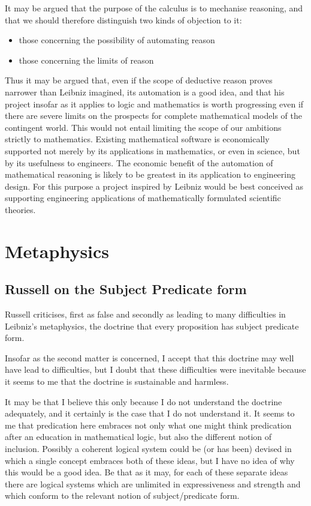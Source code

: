 \documentclass{rbjk}
\begin{document}
\begin{article}
It may be argued that the purpose of the calculus is to mechanise reasoning, and that we should therefore distinguish two kinds of objection to it:

\begin{itemize}
\item those concerning the possibility of automating reason
\item those concerning the limits of reason 
\end{itemize}

Thus it may be argued that, even if the scope of deductive reason proves narrower than Leibniz imagined, its automation is a good idea, and that his project insofar as it applies to logic and mathematics is worth progressing even if there are severe limits on the prospects for complete mathematical models of the contingent world.
This would not entail limiting the scope of our ambitions strictly to mathematics.
Existing mathematical software is economically supported not merely by its applications in mathematics, or even in science, but by its usefulness to engineers.
The economic benefit of the automation of mathematical reasoning is likely to be greatest in its application to engineering design.
For this purpose a project inspired by Leibniz would be best conceived as supporting engineering applications of mathematically formulated scientific theories.

\section{Metaphysics}

\subsection{Russell on the Subject Predicate form}

Russell criticises, first as false and secondly as leading to many difficulties in Leibniz's metaphysics, the doctrine that every proposition has subject predicate form.

Insofar as the second matter is concerned, I accept that this doctrine may well have lead to difficulties, but I doubt that these difficulties were inevitable because it seems to me that the doctrine is sustainable and harmless.

It may be that I believe this only because I do not understand the doctrine adequately, and it certainly is the case that I do not understand it.
It seems to me that predication here embraces not only what one might think predication after an education in mathematical logic, but also the different notion of inclusion.
Possibly a coherent logical system could be (or has been) devised in which a single concept embraces both of these ideas, but I have no idea of why this would be a good idea.
Be that as it may, for each of these separate ideas there are logical systems which are unlimited in expressiveness and strength and which conform to the relevant notion of subject/predicate form.


\end{article}
\end{document}
